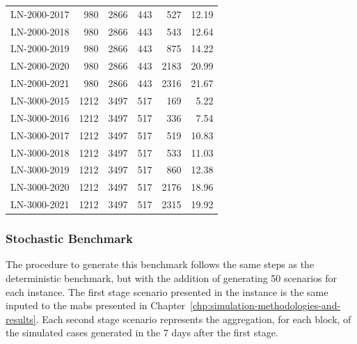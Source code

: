 \begin{table}[h!]
\begin{tabular}{lrrrrr}
		LN-2000-2017                                                                 & 980  & 2866 & 443 & 527  & 12.19 \\
		LN-2000-2018                                                                 & 980  & 2866 & 443 & 543  & 12.64 \\
		LN-2000-2019                                                                 & 980  & 2866 & 443 & 875  & 14.22 \\
		LN-2000-2020                                                                 & 980  & 2866 & 443 & 2183 & 20.99 \\
		LN-2000-2021                                                                 & 980  & 2866 & 443 & 2316 & 21.67 \\ \hline
		LN-3000-2015                                                                 & 1212 & 3497 & 517 & 169  & 5.22  \\
		LN-3000-2016                                                                 & 1212 & 3497 & 517 & 336  & 7.54  \\
		LN-3000-2017                                                                 & 1212 & 3497 & 517 & 519  & 10.83 \\
		LN-3000-2018                                                                 & 1212 & 3497 & 517 & 533  & 11.03 \\
		LN-3000-2019                                                                 & 1212 & 3497 & 517 & 860  & 12.38 \\
		LN-3000-2020                                                                 & 1212 & 3497 & 517 & 2176 & 18.96 \\
		LN-3000-2021                                                                 & 1212 & 3497 & 517 & 2315 & 19.92 \\ \hline
	\end{tabular}%
\end{table}

\subsubsection{Stochastic Benchmark}

The procedure to generate this benchmark follows the same steps as the deterministic benchmark, but with the addition of generating 50 scenarios for each instance. The first stage scenario presented in the instance is the same inputed to the \gls{mabs} presented in Chapter~\ref{chp:simulation-methodologies-and-results}. Each second stage scenario represents the aggregation, for each block, of the simulated cases generated in the 7 days after the first stage.

